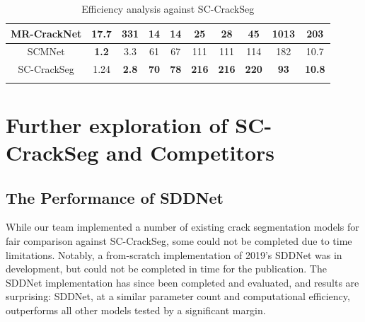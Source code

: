\documentclass[a4paper,12pt]{report}
\begin{document}
\begin{table}
\begin{adjustbox}{width=\columnwidth,center}
\begin{tabular}{|c|c|c|c|c|c|c|c|c|c|}
            \hline
            {MR-CrackNet} & {17.7}       & {331}        & {14}                                                           & {14}        & {25}         & {28}         & {45}         & {1013}                                                   & {203}         \\
            \hline
            {SCMNet}      & \textbf{1.2} & {3.3}        & {61}                                                           & {67}        & {111}        & {111}        & {114}        & {182}                                                    & {10.7}        \\
            \hline
            {SC-CrackSeg} & {1.24}       & \textbf{2.8} & \textbf{70}                                                    & \textbf{78} & \textbf{216} & \textbf{216} & \textbf{220} & \textbf{93}                                              & \textbf{10.8} \\
            \hline
            \multicolumn{10}{l}{}
        \end{tabular}
    \end{adjustbox}
    \caption{Efficiency analysis against SC-CrackSeg}
    \label{tab:sc-crackseg-initial-efficiency-comparison}
\end{table}


\section{Further exploration of SC-CrackSeg and Competitors}
\subsection{The Performance of SDDNet}
While our team implemented a number of existing crack segmentation models for fair comparison against SC-CrackSeg, some could not be completed due to time limitations. Notably, a from-scratch implementation of 2019's SDDNet \cite{choi_sddnet_2019} was in development, but could not be completed in time for the publication. The SDDNet implementation has since been completed and evaluated, and results are surprising: SDDNet, at a similar parameter count and computational efficiency, outperforms all other models tested by a significant margin.
\end{document}
